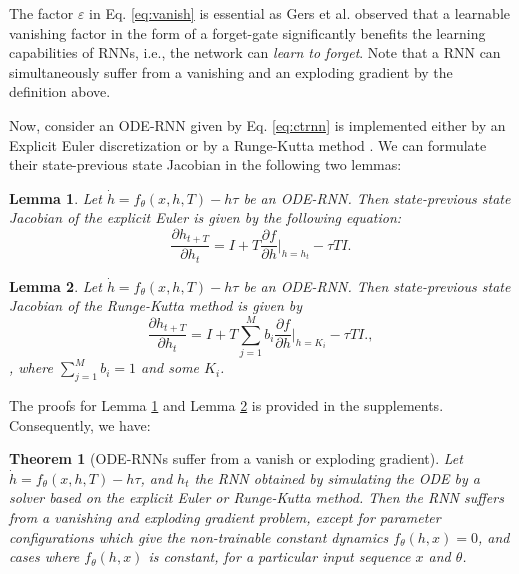 \documentclass{article}
\newtheorem{theorem}{Theorem}
\newtheorem{lemma}{Lemma}
\begin{document}
The factor $\varepsilon$ in Eq. \ref{eq:vanish} is essential as Gers et al. \cite{gers1999learning} observed that a learnable vanishing factor in the form of a forget-gate significantly benefits the learning capabilities of RNNs, i.e., the network can \emph{learn to forget}.
Note that a RNN can simultaneously suffer from a vanishing and an exploding gradient by the definition above. 

Now, consider an ODE-RNN given by Eq. \ref{eq:ctrnn} is implemented either by an Explicit Euler discretization or by a Runge-Kutta method \cite{runge1895numerische,dormand1980family}.  We can formulate their state-previous state Jacobian in the following two lemmas:

\begin{lemma}
\label{lem:1}
    Let $\dot{h} = f_\theta(x,h,T) - h \tau$ be an ODE-RNN. Then state-previous state Jacobian of the explicit Euler is given by the following equation:
    \begin{equation}
         \frac{\partial h_{t+T}}{\partial h_t} = I + T\frac{\partial f}{\partial h}\Big|_{h=h_t} - \tau T I.
    \end{equation}
\end{lemma}
\begin{lemma}
\label{lem:2}
    Let $\dot{h} = f_\theta(x,h,T) - h \tau$ be an ODE-RNN. Then state-previous state Jacobian of the Runge-Kutta method is given by
    \begin{equation}
          \frac{\partial h_{t+T}}{\partial h_t} = I + T\sum_{j=1}^{M} b_i \frac{\partial f}{\partial h}\Big|_{h=K_i} - \tau T I.,
    \end{equation}
    , where $\sum_{j=1}^{M} b_i=1$ and some $K_i$.
\end{lemma}

The proofs for Lemma \ref{lem:1} and Lemma \ref{lem:2} is provided in the supplements. Consequently, we have:

\begin{theorem}[ODE-RNNs suffer from a vanish or exploding gradient]\label{thm:odevanish}
    Let $\dot{h} = f_\theta(x,h,T) - h \tau$, and $h_t$ the RNN obtained by simulating the ODE by a solver based on the explicit Euler or Runge-Kutta method.
    Then the RNN suffers from a vanishing and exploding gradient problem, except for parameter configurations which give the non-trainable constant dynamics $f_\theta(h,x) = 0$, and cases where $f_\theta(h,x)$ is constant, for a particular input sequence $x$ and $\theta$.
\end{theorem}
\end{document}

